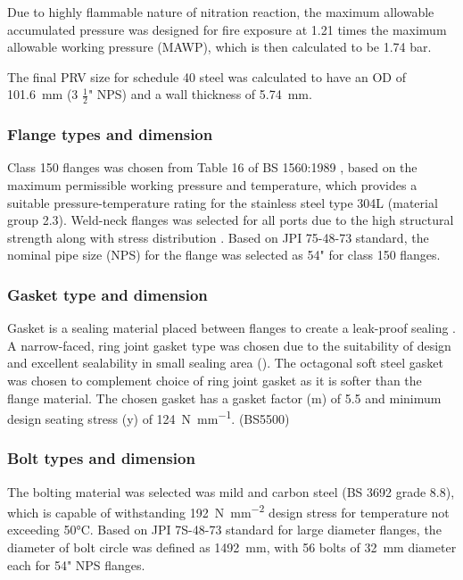 Due to highly flammable nature of nitration reaction, the maximum allowable accumulated pressure was designed for fire exposure at 1.21 times the maximum allowable working pressure (MAWP), which is then calculated to be 1.74 bar. 

The final PRV size for schedule 40 steel was calculated to have an OD of \SI{101.6}{\milli \metre} (3 $\frac{1}{2}$" NPS) and a wall thickness of \SI{5.74}{\milli \metre}.



\subsubsection{Flange types and dimension}
Class 150 flanges was chosen from Table 16 of BS 1560:1989 \cite{noauthor_circular_nodate}, based on the maximum permissible working pressure and temperature, which provides a suitable pressure-temperature rating for the stainless steel type 304L (material group 2.3). Weld-neck flanges was selected for all ports due to the high structural strength along with stress distribution \cite{ulma_forge_welding_2020}.
Based on JPI 75-48-73 standard, the nominal pipe size (NPS) for the flange was selected as 54" for class 150 flanges.
\subsubsection{Gasket type and dimension}
Gasket is a sealing material placed between flanges to create a leak-proof sealing \cite{varun_piping_nodate}. A narrow-faced, ring joint gasket type was chosen due to the suitability of design and excellent sealability in small sealing area \cite{noauthor_ring_nodate}(). The octagonal soft steel gasket was chosen to complement choice of ring joint gasket as it is softer than the flange material. The chosen gasket has a gasket factor (m) of 5.5 and minimum design seating stress (y) of \SI{124}{\N\per\mm}. (BS5500)

\subsubsection{Bolt types and dimension}
The bolting material was selected was mild and carbon steel (BS 3692 grade 8.8), which is capable of withstanding \SI{192}{\N\per\square\mm} design stress for temperature not exceeding 50°C. Based on JPI 7S-48-73 standard for large diameter flanges, the diameter of bolt circle was defined as \SI{1492}{\milli \metre}, with 56 bolts of \SI{32}{\milli \metre} diameter each for 54" NPS flanges. 

